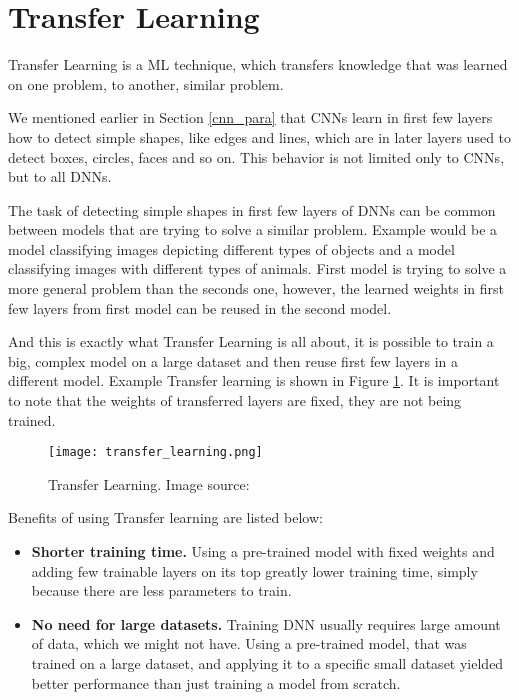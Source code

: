 \section{ Transfer Learning}\label{transfer_para}

Transfer Learning is a ML technique, which transfers knowledge that was learned on one problem, to another, similar problem.

We mentioned earlier in Section \ref{cnn_para} that CNNs learn in first few layers how to detect simple shapes, like edges and lines, which are in later layers used to detect boxes, circles, faces and so on. 
This behavior is not limited only to CNNs, but to all DNNs.

The task of detecting simple shapes in first few layers of DNNs can be common between models that are trying to solve a similar problem.
Example would be a model classifying images depicting different types of objects and a model classifying images with different types of animals.
First model is trying to solve a more general problem than the seconds one, however, the learned weights in first few layers from first model can be reused in the second model.

And this is exactly what Transfer Learning is all about, it is possible to train a big, complex model on a large dataset and then reuse first few layers in a different model.
Example Transfer learning is shown in Figure \ref{transfer_learning}.
It is important to note that the weights of transferred layers are fixed, they are not being trained.

\begin{figure}[ht] 
    \centering
    \texttt{[image: transfer\_learning.png]} 
    \caption[Transfer Learning.] {Transfer Learning. Image source: \cite{geron}}
    \label{transfer_learning}
\end{figure}

Benefits of using Transfer learning are listed below:

\begin{itemize}
    \item \textbf{Shorter training time.} Using a pre-trained model with fixed weights and adding few trainable layers on its top greatly lower training time, simply because there are less parameters to train.
    \item \textbf{No need for large datasets.} Training DNN usually requires large amount of data, which we might not have. Using a pre-trained model, that was trained on a large dataset, and applying it to a specific small dataset yielded better performance than just training a model from scratch\cite{geron}.
\end{itemize}


